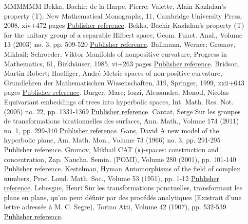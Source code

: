 \begin{thebibliography}{MMMMMM}
 Bekka, Bachir; de la Harpe, Pierre; Valette, Alain Kazhdan’s property (T), New Mathematical Monographs, 11, Cambridge University Press, 2008, xiv+472 pages \href{https://ahl.centre-mersenne.org/item/AHL_2019__2__259_0/#Bekka-Harpe-Valette}{Publisher reference}.
 Bekka, Bachir Kazhdan’s property (T) for the unitary group of a separable Hilbert space, Geom. Funct. Anal., Volume 13 (2003) no. 3, pp. 509-520 \href{https://ahl.centre-mersenne.org/item/AHL_2019__2__259_0/#Bekka03}{Publisher reference}.
 Ballmann, Werner; Gromov, Mikhail; Schroeder, Viktor Manifolds of nonpositive curvature, Progress in Mathematics, 61, Birkhäuser, 1985, vi+263 pages \href{https://ahl.centre-mersenne.org/item/AHL_2019__2__259_0/#Ballmann-Gromov-Schroeder}{Publisher reference}.
 Bridson, Martin Robert; Haefliger, André Metric spaces of non-positive curvature, Grundlehren der Mathematischen Wissenschaften, 319, Springer, 1999, xxii+643 pages \href{https://ahl.centre-mersenne.org/item/AHL_2019__2__259_0/#Bridson-Haefliger}{Publisher reference}.
 Burger, Marc; Iozzi, Alessandra; Monod, Nicolas Equivariant embeddings of trees into hyperbolic spaces, Int. Math. Res. Not. (2005) no. 22, pp. 1331-1369 \href{https://ahl.centre-mersenne.org/item/AHL_2019__2__259_0/#Burger-Iozzi-Monod}{Publisher reference}.
 Cantat, Serge Sur les groupes de transformations birationnelles des surfaces, Ann. Math., Volume 174 (2011) no. 1, pp. 299-340 \href{https://ahl.centre-mersenne.org/item/AHL_2019__2__259_0/#Cantat}{Publisher reference}.
 Gans, David A new model of the hyperbolic plane, Am. Math. Mon., Volume 73 (1966) no. 3, pp. 291-295 \href{https://ahl.centre-mersenne.org/item/AHL_2019__2__259_0/#Gans66}{Publisher reference}.
 Gromov, Mikhail  CAT (κ)-spaces: construction and concentration, Zap. Nauchn. Semin. (POMI), Volume 280 (2001), pp. 101-140 \href{https://ahl.centre-mersenne.org/item/AHL_2019__2__259_0/#Gromov_conc}{Publisher reference}.
 Kestelman, Hyman Automorphisms of the field of complex numbers, Proc. Lond. Math. Soc., Volume 53 (1951), pp. 1-12 \href{https://ahl.centre-mersenne.org/item/AHL_2019__2__259_0/#Kestelman51}{Publisher reference}.
 Lebesgue, Henri Sur les transformations ponctuelles, transformant les plans en plans, qu’on peut définir par des procédés analytiques (Existrait d’une lettre adressée à M. C. Segre), Torino Atti, Volume 42 (1907), pp. 532-539 \href{https://ahl.centre-mersenne.org/item/AHL_2019__2__259_0/#Lebesgue07}{Publisher reference}.

\end{thebibliography}
